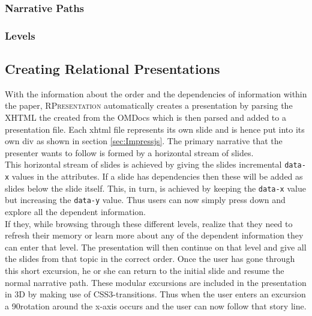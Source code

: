 \documentclass[twoside, 12pt]{article}
\newcommand{\sys}{\textsc{RPresentation}\xspace}
\begin{document}



\subsubsection{Narrative Paths}
\subsubsection{Levels}

\subsection{Creating Relational Presentations}
\label{sec:wp1}

With the information about the order and the dependencies of information within the paper, \sys automatically creates a presentation by parsing the XHTML the created from the OMDocs which is then parsed and added to a presentation file. Each xhtml file represents its own slide and is hence put into its own div as shown in section \ref{sec:Impressjs}. The primary narrative that the presenter wants to follow is formed by a horizontal stream of slides. \\

This horizontal stream of slides is achieved by giving the slides incremental \texttt{data-x} values in the attributes. If a slide has dependencies then these will be added as slides below the slide itself. This, in turn, is achieved by keeping the \texttt{data-x} value but increasing the \texttt{data-y} value. Thus users can now simply press down and explore all the dependent information.\\ 

If they, while browsing through these different levels, realize that they need to refresh their memory or learn more about any of the dependent information they can enter that level. The presentation will then continue on that level and give all the slides from that topic in the correct order. Once the user has gone through this short excursion, he or she can return to the initial slide and resume the normal narrative path. These modular excursions are included in the presentation in 3D by making use of CSS3-transitions. Thus when the user enters an excursion a 90\degree rotation around the x-axis occurs and the user can now follow that story line.\\
\end{document}
